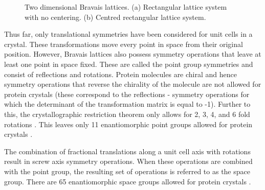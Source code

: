 \begin{figure}
\begin{subfigure}[b]{0.45\textwidth}
                    \caption{}
                    \label{fig:2D centred rectangular Bravais lattice}
            \end{subfigure}
            \caption[Two dimensional Bravais lattices.]{Two dimensional Bravais lattices. (a) Rectangular lattice system with no centering. (b) Centred rectangular lattice system.}
    		\label{fig:2D Bravais lattices}
        \end{figure}

        Thus far, only translational symmetries have been considered for unit cells in a crystal.
        These transformations move every point in space from their original position.
        However, Bravais lattices also possess symmetry operations that leave at least one point in space fixed.
        These are called the point group symmetries and consist of reflections and rotations.
        Protein molecules are chiral and hence symmetry operations that reverse the chirality of the molecule are not allowed for protein crystals (these correspond to the reflections - symmetry operations for which the determinant of the transformation matrix is equal to -1).
        Further to this, the crystallographic restriction theorem only allows for 2, 3, 4, and 6 fold rotations \cite{coxeter1973regular}.
        This leaves only 11 enantiomorphic point groups allowed for protein crystals \cite{drenth2012}.

        The combination of fractional translations along a unit cell axis with rotations result in screw axis symmetry operations.
        When these operations are combined with the point group, the resulting set of operations is referred to as the space group.
        There are 65 enantiomorphic space groups allowed for protein crystals \cite{drenth2012}.

